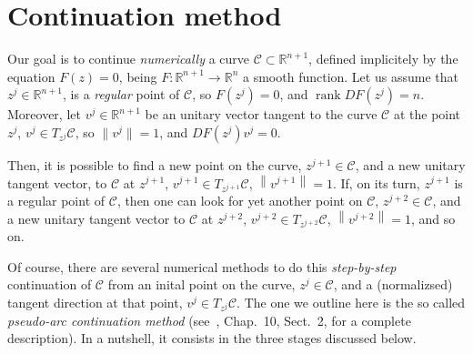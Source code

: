 \documentclass[11pt,reqno,twoside]{article}
\newcommand{\R}{\ensuremath{\mathbb{R}}}
\theoremstyle{remark}
\begin{document}
\title{}
\author{}
\date{}

\section{Continuation method}\label{sec:pseudoArc} Our goal is to continue
\emph{numerically} a curve $\mathcal{C}\subset\R^{n+1}$, defined
implicitely by the equation
       $F(z) = 0$,
being $F:\R^{n+1}\longrightarrow \R^{n}$ a smooth function. Let us assume
that $z^{j}\in\R^{n+1}$, is a \emph{regular} point of $\mathcal{C}$, so 
$F\left(z^{j}\right) = 0$, and
  $\mathop{rank}DF\left(z^{j}\right) = n$.
Moreover, let $v^{j}\in\R^{n+1}$ be an unitary vector tangent to the curve
$\mathcal{C}$ at the point $z^{j}$, $v^{j}\in T_{z^{j}}\mathcal{C}$, so 
  $\| v^{j}\| = 1$, and
  $DF\left(z^{j}\right) v^{j} = 0$.

Then, it is possible to find a new point on the curve,
$z^{j+1}\in\mathcal{C}$, and a new unitary tangent vector, to 
$\mathcal{C}$ at $z^{j+1}$, $v^{j+1}\in T_{z^{j+1}}\mathcal{C}$,
$\left\|v^{j+1}\right\| = 1$. If, on its turn, $z^{j+1}$ is a regular point
of $\mathcal{C}$, then  one can look for yet another point on
$\mathcal{C}$, $z^{j+2}\in\mathcal{C}$, and a new unitary tangent vector to
$\mathcal{C}$ at $z^{j+2}$, $v^{j+2}\in T_{z^{j+2}}\mathcal{C}$,
$\left\|v^{j+2}\right\| = 1$, and so on.

Of course, there are several numerical methods to do this
\emph{step-by-step} continuation of $\mathcal{C}$ from an inital point on
the curve, $z^{j}\in\mathcal{C}$, and a (normalizsed) tangent direction at
that point, $v^{j}\in T_{z^{j}}\mathcal{C}$. The one we outline here is the so
called \emph{pseudo-arc continuation method} (see~\cite{Kuznetsov2004},
Chap.~10, Sect.~2, for a complete description). In a nutshell, it consists
in the three stages discussed below.
\end{document}

